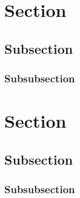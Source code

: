 \documentclass{article}
\begin{document}
\doublespacing
\tableofcontents
\singlespacing

\newpage

\section{Section}
\subsection{Subsection}
\subsubsection{Subsubsection}

\section{Section}
\subsection{Subsection}
\subsubsection{Subsubsection}
\end{document}
